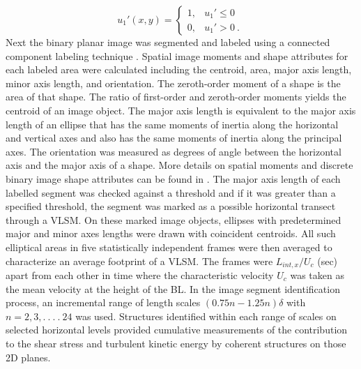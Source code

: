 \begin{equation}
	u_{1}'(x,y) = \begin{cases}	
	1, &\text{$u_{1}' \leq 0$ }\\
	0, &\text{$u_{1}' >  0$}\ .
	\end{cases}
	\label{case:binary-vel}
\end{equation}
\noindent Next the binary planar image was segmented and labeled using a connected component labeling technique \citep{book_comp_vision_davies}. Spatial image moments and shape attributes for each labeled area were calculated including the centroid, area, major axis length, minor axis length, and orientation. The zeroth-order moment of a shape is the area of that shape. The ratio of first-order and zeroth-order moments yields the centroid of an image object. The major axis length is equivalent to the major axis length of an ellipse that has the same moments of inertia along the horizontal and vertical axes and also has the same moments of inertia along the principal axes. The orientation was measured as degrees of angle between the horizontal axis and the major axis of a shape.  More details on spatial moments and discrete binary image shape attributes can be found in \citet{book_intro_dimg_proc_pratt}. The major axis length of each labelled segment was checked against a threshold and if it was greater than a specified threshold, the segment was marked as a possible horizontal transect through a VLSM. On these marked image objects, ellipses with predetermined major and minor axes lengths were drawn with coincident centroids. All such elliptical areas in five statistically independent frames were then averaged to characterize an  average footprint of a VLSM. The frames were $L_{int,x}/U_c$ (sec) apart from each other in time where the characteristic velocity $U_c$ was taken as the mean velocity at the height of the BL.  In the image segment identification process, an incremental range of length scales $(0.75n-1.25n)\delta $ with $n= 2,3,.\ .\  .\  . \ 24$ was used.  Structures identified within each  range of scales on selected horizontal levels provided cumulative measurements of the contribution to the shear stress and turbulent kinetic energy by coherent structures on those 2D planes.

